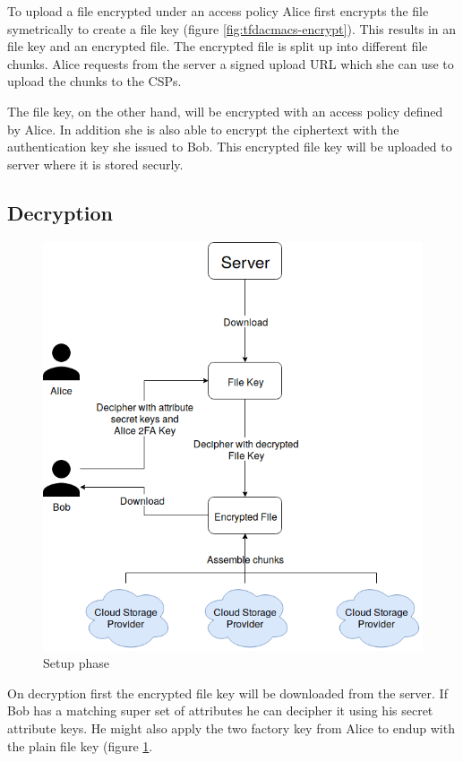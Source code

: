 To upload a file encrypted under an access policy Alice first encrypts the file symetrically to create a file key (figure \ref{fig:tfdacmacs-encrypt}). This results in an file key and an encrypted file. The encrypted file is split up into different file chunks. Alice requests from the server a signed upload URL which she can use to upload the chunks to the CSPs. 

The file key, on the other hand, will be encrypted with an access policy defined by Alice. In addition she is also able to encrypt the ciphertext with the authentication key she issued to Bob. This encrypted file key will be uploaded to server where it is stored securly. 

\subsection{Decryption}
\begin{figure}[!t]
\centering
    \includegraphics[width=\linewidth]{img/TF-DAC-MACS-overview-decrypt.png}
    \caption{Setup phase}
    \label{fig:tfdacmacs-decryption}
\end{figure}

On decryption first the encrypted file key will be downloaded from the server. If Bob has a matching super set of attributes he can decipher it using his secret attribute keys. He might also apply the two factory key from Alice to endup with the plain file key (figure \ref{fig:tfdacmacs-decryption}. 

